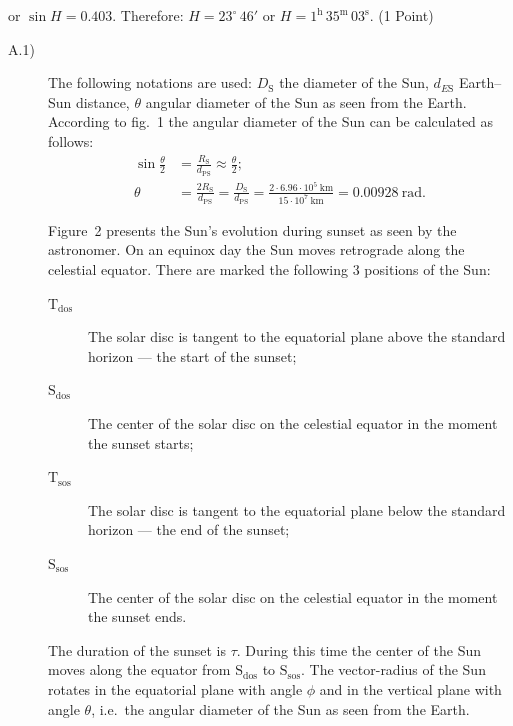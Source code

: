or $\sin H = 0.403$. Therefore: $H = 23^\circ\,46'$ or
$H = 1^{\mathrm{h}}\,35^{\mathrm{m}}\,03^{\mathrm{s}}$.
\hfill(1 Point)

\begin{description}
\item[A.1)] The following notations are used: $D_{\mathrm{S}}$ the diameter
  of the Sun, $d_{E\mathrm{S}}$ Earth--Sun distance, $\theta$ angular
  diameter of the Sun as seen from the Earth.
  According to fig.~1 the angular diameter of the Sun can be calculated as
  follows:
  \begin{align*}
  \sin\frac{\theta}{2} &= \frac{R_{\mathrm{S}}}{d_{\mathrm{PS}}}
    \approx \frac{\theta}{2};
  \\
  \theta &= \frac{2R_{\mathrm{S}}}{d_{\mathrm{PS}}}
    = \frac{D_{\mathrm{S}}}{d_{\mathrm{PS}}}
    = \frac{2\cdot 6.96\cdot 10^{5}\ \mathrm{km}}{15\cdot 10^{7}\ \mathrm{km}}
    = 0.00928\ \mathrm{rad}.
  \end{align*}

  Figure~2 presents the Sun's evolution during sunset as seen by the
  astronomer. On an equinox day the Sun moves retrograde along the celestial
  equator. There are marked the following 3 positions of the Sun:
  \begin{description}
  \item[$\mathrm{T_{dos}}$] The solar disc is tangent to the equatorial plane
    above the standard horizon --- the start of the sunset;
  \item[$\mathrm{S_{dos}}$] The center of the solar disc on the celestial
    equator in the moment the sunset starts;
  \item[$\mathrm{T_{sos}}$] The solar disc is tangent to the equatorial plane
    below the standard horizon --- the end of the sunset;
  \item[$\mathrm{S_{sos}}$] The center of the solar disc on the celestial
    equator in the moment the sunset ends.
  \end{description}

  The duration of the sunset is $\tau$. During this time the center of the
  Sun moves along the equator from $\mathrm{S_{dos}}$ to $\mathrm{S_{sos}}$.
  The vector-radius of the Sun rotates in the equatorial plane with angle
  $\phi$ and in the vertical plane with angle $\theta$, i.e.\ the angular
  diameter of the Sun as seen from the Earth.


\end{description}
